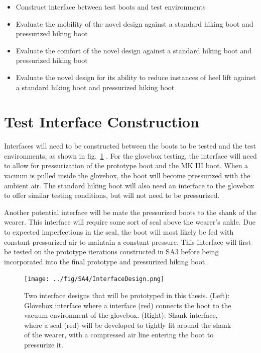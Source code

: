 \documentclass[defaultstyle,11pt]{comps}
\providecommand{\tightlist}{%
  \setlength{\itemsep}{0pt}\setlength{\parskip}{0pt}}
\begin{document}
\begin{itemize}
\tightlist
\item
  Construct interface between test boots and test environments
\item
  Evaluate the mobility of the novel design against a standard hiking boot and pressurized hiking boot
\item
  Evaluate the comfort of the novel design against a standard hiking boot and pressurized hiking boot
\item
  Evaluate the novel design for its ability to reduce instances of heel lift against a standard hiking boot and pressurized hiking boot
\end{itemize}

\hypertarget{test-interface-construction}{%
\section{Test Interface Construction}\label{test-interface-construction}}

Interfaces will need to be constructed between the boots to be tested and the test environments, as shown in fig.~\ref{fig:SA4-interface} .
For the glovebox testing, the interface will need to allow for pressurization of the prototype boot and the MK III boot.
When a vacuum is pulled inside the glovebox, the boot will become pressurized with the ambient air.
The standard hiking boot will also need an interface to the glovebox to offer similar testing conditions, but will not need to be pressurized.

Another potential interface will be mate the pressurized boots to the shank of the wearer.
This interface will require some sort of seal above the wearer's ankle.
Due to expected imperfections in the seal, the boot will most likely be fed with constant pressurized air to maintain a constant pressure.
This interface will first be tested on the prototype iterations constructed in SA3 before being incorporated into the final prototype and pressurized hiking boot.

\begin{figure}
\hypertarget{fig:SA4-interface}{%
\centering
\texttt{[image: ../fig/SA4/InterfaceDesign.png]}
\caption{Two interface designs that will be prototyped in this thesis. (Left): Glovebox interface where a interface (red) connects the boot to the vacuum environment of the glovebox. (Right): Shank interface, where a seal (red) will be developed to tightly fit around the shank of the wearer, with a compressed air line entering the boot to pressurize it.}\label{fig:SA4-interface}
}
\end{figure}
\end{document}
